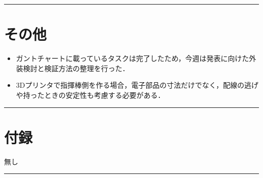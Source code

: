 \documentclass[uplatex,dvipdfmx,a4paper,11pt]{jsarticle}
\newcommand{\sectionrule}{\par\medskip\noindent\rule{\linewidth}{0.6pt}\par\medskip}
\begin{document}
\sectionrule

\section{その他}

\begin{itemize}
  \item ガントチャートに載っているタスクは完了したため，今週は発表に向けた外装検討と検証方法の整理を行った．
  \item 3Dプリンタで指揮棒側を作る場合，電子部品の寸法だけでなく，配線の逃げや持ったときの安定性も考慮する必要がある．
\end{itemize}

\sectionrule

\section{付録}

無し

\sectionrule
\end{document}
